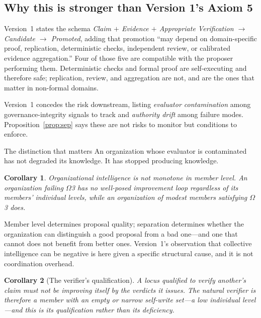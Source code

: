 \documentclass[11pt]{article}
\newtheorem{corollary}{Corollary}
\begin{document}
\subsection{Why this is stronger than Version 1's Axiom 5}

Version~1 states the schema \emph{Claim $+$ Evidence $+$ Appropriate Verification $\to$ Candidate $\to$ Promoted}, adding that promotion ``may depend on domain-specific proof, replication, deterministic checks, independent review, or calibrated evidence aggregation.'' Four of those five are compatible with the proposer performing them. Deterministic checks and formal proof are self-executing and therefore safe; replication, review, and aggregation are not, and are the ones that matter in non-formal domains.

Version~1 concedes the risk downstream, listing \emph{evaluator contamination} among governance-integrity signals to track and \emph{authority drift} among failure modes. Proposition~\ref{prop:sep} says these are not risks to monitor but conditions to enforce.

\begin{cautionbox}{The distinction that matters}
An organization whose evaluator is contaminated has not degraded its knowledge. It has stopped producing knowledge.
\end{cautionbox}

\begin{corollary}\label{cor:monotone}
Organizational intelligence is not monotone in member level. An organization failing $\Omega$3 has no well-posed improvement loop regardless of its members' individual levels, while an organization of modest members satisfying $\Omega$3 does.
\end{corollary}

Member level determines proposal quality; separation determines whether the organization can distinguish a good proposal from a bad one---and one that cannot does not benefit from better ones. Version~1's observation that collective intelligence can be negative \citep{woolley2010collective} is here given a specific structural cause, and it is not coordination overhead.

\begin{corollary}[The verifier's qualification]
A locus qualified to verify another's claim must not be improving \emph{itself} by the verdicts it issues. The natural verifier is therefore a member with an empty or narrow self-write set---a low individual level---and this is its qualification rather than its deficiency.
\end{corollary}
\end{document}
